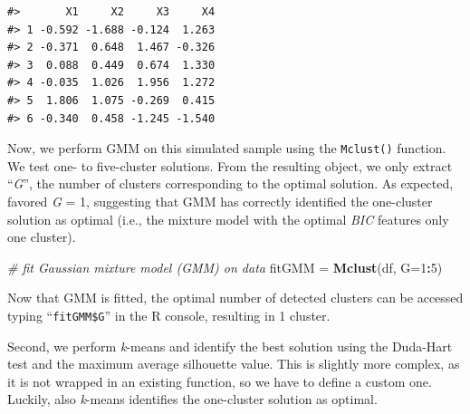 \documentclass[
  man,floatsintext]{apa7}
\newenvironment{Shaded}{\begin{snugshade}}{\end{snugshade}}
\newcommand{\AttributeTok}[1]{\textcolor[rgb]{0.13,0.29,0.53}{#1}}
\newcommand{\CommentTok}[1]{\textcolor[rgb]{0.56,0.35,0.01}{\textit{#1}}}
\newcommand{\DecValTok}[1]{\textcolor[rgb]{0.00,0.00,0.81}{#1}}
\newcommand{\FunctionTok}[1]{\textcolor[rgb]{0.13,0.29,0.53}{\textbf{#1}}}
\newcommand{\NormalTok}[1]{#1}
\newcommand{\OtherTok}[1]{\textcolor[rgb]{0.56,0.35,0.01}{#1}}
\newcommand{\SpecialCharTok}[1]{\textcolor[rgb]{0.81,0.36,0.00}{\textbf{#1}}}
\begin{document}
\begin{verbatim}
#>       X1     X2     X3     X4
#> 1 -0.592 -1.688 -0.124  1.263
#> 2 -0.371  0.648  1.467 -0.326
#> 3  0.088  0.449  0.674  1.330
#> 4 -0.035  1.026  1.956  1.272
#> 5  1.806  1.075 -0.269  0.415
#> 6 -0.340  0.458 -1.245 -1.540
\end{verbatim}

Now, we perform GMM on this simulated sample using the \texttt{Mclust()} function. We test one- to five-cluster solutions. From the resulting object, we only extract ``\emph{G}'', the number of clusters corresponding to the optimal solution. As expected, favored \emph{G} = 1, suggesting that GMM has correctly identified the one-cluster solution as optimal (i.e., the mixture model with the optimal \emph{BIC} features only one cluster).

\begin{Shaded}
\begin{Highlighting}[]
\CommentTok{\# fit Gaussian mixture model (GMM) on data}
\NormalTok{fitGMM }\OtherTok{=} \FunctionTok{Mclust}\NormalTok{(df, }\AttributeTok{G=}\DecValTok{1}\SpecialCharTok{:}\DecValTok{5}\NormalTok{)}
\end{Highlighting}
\end{Shaded}

Now that GMM is fitted, the optimal number of detected clusters can be accessed typing ``\texttt{fitGMM\$G}'' in the R console, resulting in 1 cluster.

Second, we perform \emph{k}-means and identify the best solution using the Duda-Hart test and the maximum average silhouette value. This is slightly more complex, as it is not wrapped in an existing function, so we have to define a custom one. Luckily, also \emph{k}-means identifies the one-cluster solution as optimal.
\end{document}
